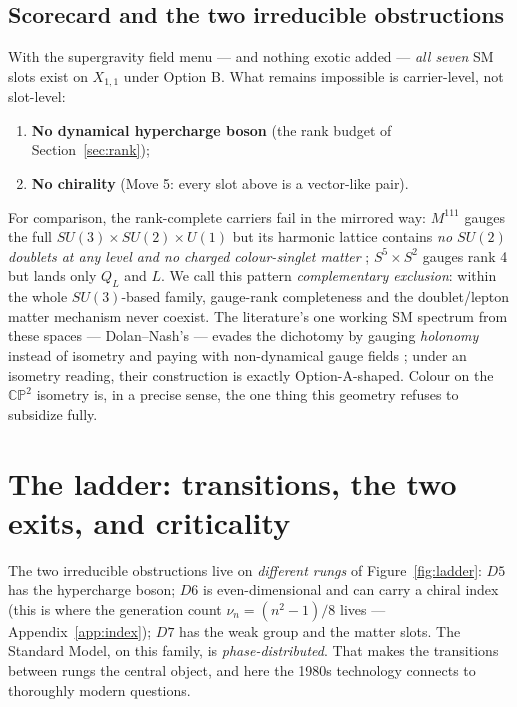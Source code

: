 \documentclass[11pt]{article}
\newcommand{\X}{X_{1,1}}
\newcommand{\CP}{\mathbb{CP}}
\begin{document}
\subsection{Scorecard and the two irreducible obstructions}

With the supergravity field menu --- and nothing exotic added --- \emph{all seven} SM slots
exist on $\X$ under Option B. What remains impossible is carrier-level, not slot-level:
\begin{enumerate}
\item \textbf{No dynamical hypercharge boson} (the rank budget of Section~\ref{sec:rank});
\item \textbf{No chirality} (Move 5: every slot above is a vector-like pair).
\end{enumerate}
For comparison, the rank-complete carriers fail in the mirrored way: $M^{111}$ gauges the
full $SU(3)\times SU(2)\times U(1)$ but its harmonic lattice contains \emph{no $SU(2)$
doublets at any level and no charged colour-singlet matter} \cite{FabbriFre99};
$S^5\times S^2$ gauges rank 4 but lands only $Q_L$ and $L$. We call this pattern
\emph{complementary exclusion}: within the whole $SU(3)$-based family, gauge-rank
completeness and the doublet/lepton matter mechanism never coexist. The literature's one
working SM spectrum from these spaces --- Dolan--Nash's --- evades the dichotomy by gauging
\emph{holonomy} instead of isometry and paying with non-dynamical gauge fields
\cite{DolanNash02,DolanNash02b}; under an isometry reading, their construction is exactly
Option-A-shaped. Colour on the $\CP^2$ isometry is, in a precise sense, the one thing this
geometry refuses to subsidize fully.

\section{The ladder: transitions, the two exits, and criticality}\label{sec:ladder}

The two irreducible obstructions live on \emph{different rungs} of Figure~\ref{fig:ladder}:
$D5$ has the hypercharge boson; $D6$ is even-dimensional and can carry a chiral index
(this is where the generation count $\nu_n=(n^2-1)/8$ lives --- Appendix~\ref{app:index});
$D7$ has the weak group and the matter slots. The Standard Model, on this family, is
\emph{phase-distributed}. That makes the transitions between rungs the central object, and
here the 1980s technology connects to thoroughly modern questions.
\end{document}
